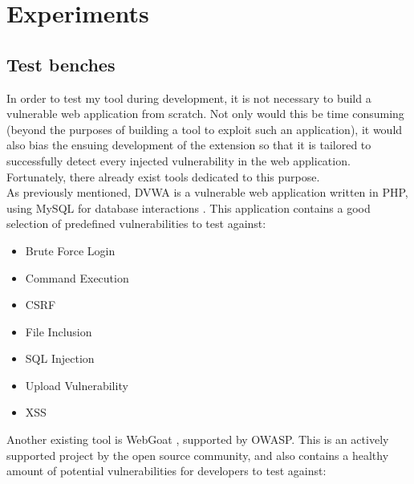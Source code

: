 \section{Experiments}


\subsection{Test benches}
In order to test my tool during development, it is not necessary to build a vulnerable web application from scratch. Not only would this be time consuming (beyond the purposes of building a tool to exploit such an application), it would also bias the ensuing development of the extension so that it is tailored to successfully detect every injected vulnerability in the web application. Fortunately, there already exist tools dedicated to this purpose. \\

As previously mentioned, DVWA is a vulnerable web application written in PHP, using MySQL for database interactions \cite{dvwaSite}. This application contains a good selection of predefined vulnerabilities to test against:
\begin{multicols}{3}
\begin{itemize}
\item Brute Force Login
\item Command Execution
\item CSRF
\item File Inclusion
\item SQL Injection
\item Upload Vulnerability
\item XSS	
\end{itemize}
\end{multicols}

Another existing tool is WebGoat \cite{webgoatIntro, webgoatGithub}, supported by OWASP. This is an actively supported project by the open source community, and also contains a healthy amount of potential vulnerabilities for developers to test against:

